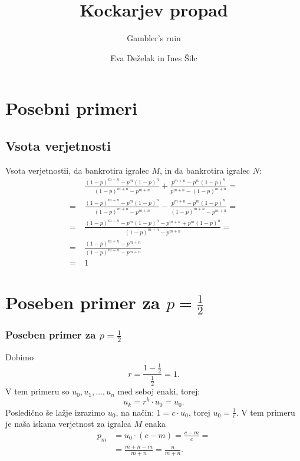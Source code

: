 \documentclass[10pt]{beamer}
\begin{document}
\title[Kockarjev propad ]{Kockarjev propad}
\subtitle{Gambler's ruin}
\author{Eva Deželak in Ines Šilc}

\begin{frame}
	\titlepage
\end {frame}
\section[Posebni primeri]{Posebni primeri}
\begin{frame}
\section[Vsota verjetnosti]{Vsota verjetnosti}
Vsota verjetnostii, da bankrotira igralec $M$, in da bankrotira igralec $N$:\\
\begin{equation*}
\begin{split}
&~\frac{(1-p)^{m+n}-p^m (1-p)^n}{(1-p)^{m+n}-p^{m+n}}+\frac{p^{m+n}-p^m
   (1-p)^n}{p^{m+n}-(1-p)^{m+n}} =\\
= &~\frac{(1-p)^{m+n}-p^m (1-p)^n}{(1-p)^{m+n}-p^{m+n}}-\frac{p^{m+n}-p^m
   (1-p)^n}{(1-p)^{m+n}-p^{m+n}} =\\
= &~\frac{(1-p)^{m+n}-p^m (1-p)^n-p^{m+n}+p^m
   (1-p)^n}{(1-p)^{m+n}-p^{m+n}} =\\
= &~\frac{(1-p)^{m+n}-p^{m+n}}{(1-p)^{m+n}-p^{m+n}} \\
= &~1
\end{split} 
\end{equation*}

\end{frame}

\section[Poseben primer za $p = \frac{1}{2}$]{Poseben primer za $p = \frac{1}{2}$}
\begin{frame}
\frametitle{Poseben primer za $p = \frac{1}{2}$}
Dobimo $$r = \frac{1 - \frac{1}{2}}{\frac{1}{2}} = 1.$$
V tem primeru so $u_0, u_1, \dotso, u_n$ med seboj enaki, torej:
$$u_k = r^k \cdot u_0 = u_0.$$
Posledično še lažje izrazimo $u_0$, na način:
$1 = c\cdot u_0$, torej $u_0 = \frac{1}{c}.$
V tem primeru je naša iskana verjetnost za igralca $M$ enaka
\begin{equation*}
\begin{split}
p_m &= u_0 \cdot (c - m) = \frac{c-m}{c} = \\
		&= \frac{m + n - m}{m + n} = \frac{n}{m + n}.
\end{split} 
\end{equation*}
\end{frame}
\end{document}
